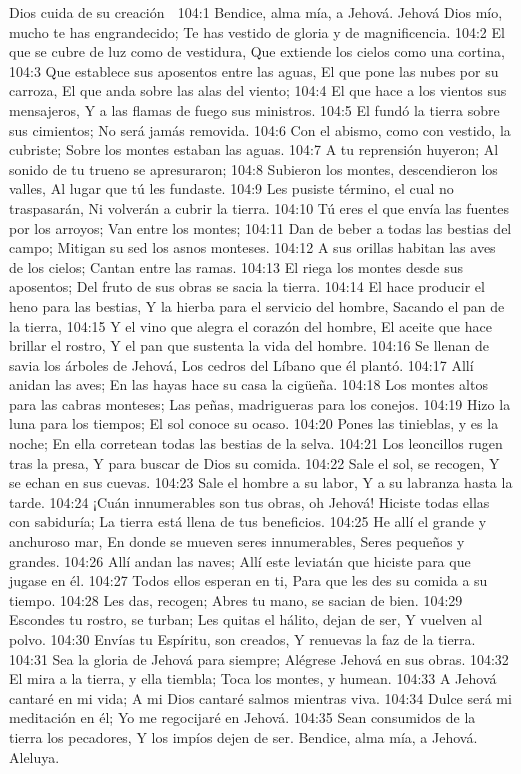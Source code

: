 Dios cuida de su creación 

104:1 Bendice, alma mía, a Jehová. 
Jehová Dios mío, mucho te has engrandecido; 
Te has vestido de gloria y de magnificencia. 
104:2 El que se cubre de luz como de vestidura, 
Que extiende los cielos como una cortina, 
104:3 Que establece sus aposentos entre las aguas, 
El que pone las nubes por su carroza, 
El que anda sobre las alas del viento; 
104:4 El que hace a los vientos sus mensajeros, 
Y a las flamas de fuego sus ministros. 
104:5 El fundó la tierra sobre sus cimientos; 
No será jamás removida. 
104:6 Con el abismo, como con vestido, la cubriste; 
Sobre los montes estaban las aguas. 
104:7 A tu reprensión huyeron; 
Al sonido de tu trueno se apresuraron; 
104:8 Subieron los montes, descendieron los valles, 
Al lugar que tú les fundaste. 
104:9 Les pusiste término, el cual no traspasarán, 
Ni volverán a cubrir la tierra. 
104:10 Tú eres el que envía las fuentes por los arroyos; 
Van entre los montes; 
104:11 Dan de beber a todas las bestias del campo; 
Mitigan su sed los asnos monteses. 
104:12 A sus orillas habitan las aves de los cielos; 
Cantan entre las ramas. 
104:13 El riega los montes desde sus aposentos; 
Del fruto de sus obras se sacia la tierra. 
104:14 El hace producir el heno para las bestias, 
Y la hierba para el servicio del hombre, 
Sacando el pan de la tierra, 
104:15 Y el vino que alegra el corazón del hombre, 
El aceite que hace brillar el rostro, 
Y el pan que sustenta la vida del hombre. 
104:16 Se llenan de savia los árboles de Jehová, 
Los cedros del Líbano que él plantó. 
104:17 Allí anidan las aves; 
En las hayas hace su casa la cigüeña. 
104:18 Los montes altos para las cabras monteses; 
Las peñas, madrigueras para los conejos. 
104:19 Hizo la luna para los tiempos; 
El sol conoce su ocaso. 
104:20 Pones las tinieblas, y es la noche; 
En ella corretean todas las bestias de la selva. 
104:21 Los leoncillos rugen tras la presa, 
Y para buscar de Dios su comida. 
104:22 Sale el sol, se recogen, 
Y se echan en sus cuevas. 
104:23 Sale el hombre a su labor, 
Y a su labranza hasta la tarde. 
104:24 ¡Cuán innumerables son tus obras, oh Jehová! 
Hiciste todas ellas con sabiduría; 
La tierra está llena de tus beneficios. 
104:25 He allí el grande y anchuroso mar, 
En donde se mueven seres innumerables, 
Seres pequeños y grandes. 
104:26 Allí andan las naves; 
Allí este leviatán que hiciste para que jugase en él. 
104:27 Todos ellos esperan en ti, 
Para que les des su comida a su tiempo. 
104:28 Les das, recogen; 
Abres tu mano, se sacian de bien. 
104:29 Escondes tu rostro, se turban; 
Les quitas el hálito, dejan de ser, 
Y vuelven al polvo. 
104:30 Envías tu Espíritu, son creados, 
Y renuevas la faz de la tierra. 
104:31 Sea la gloria de Jehová para siempre; 
Alégrese Jehová en sus obras. 
104:32 El mira a la tierra, y ella tiembla; 
Toca los montes, y humean. 
104:33 A Jehová cantaré en mi vida; 
A mi Dios cantaré salmos mientras viva. 
104:34 Dulce será mi meditación en él; 
Yo me regocijaré en Jehová. 
104:35 Sean consumidos de la tierra los pecadores, 
Y los impíos dejen de ser. 
Bendice, alma mía, a Jehová. 
Aleluya. 

